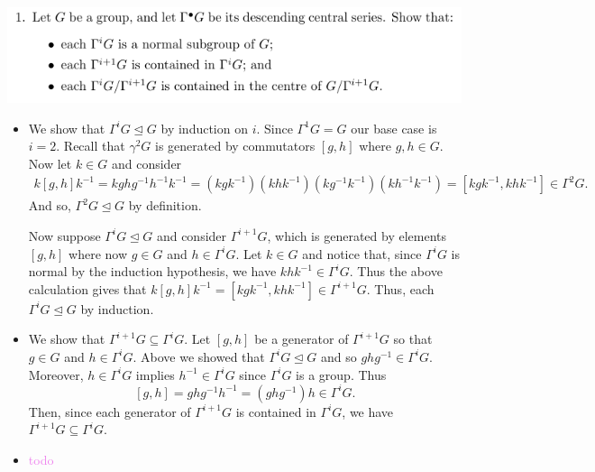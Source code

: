 \documentclass[12pt,letterpaper,boxed]{hmcpset}
\newcommand{\wg}[1]{\textcolor{violet}{#1}}
\newcommand{\inv}{^{-1}}
\newcommand{\normal}{\unlhd} %
\begin{document}


\begin{problem}
	\includegraphics[scale=0.8]{1.png}
	\hfill
\end{problem}

\begin{solution}
\begin{itemize}
\item 
We show that $\Gamma^iG \normal G$ by induction on $i$. Since
$\Gamma^1 G = G$ our base case is $i=2$. Recall that $\gamma^2 G$ is
generated by commutators $[g,h]$ where $g, h \in G$. Now let $k \in G$
and consider 
\begin{align*}
	k [g,h] k\inv = k g h g\inv h\inv k\inv
	= (kgk\inv)(k h k\inv) (k g\inv k\inv) (k h\inv k\inv)
	= [k g k\inv, k h k\inv] \in \Gamma^2 G.
\end{align*}
And so, $\Gamma^2 G \normal G$ by definition.

Now suppose $\Gamma^i G \normal G$ and consider $\Gamma^{i+1} G$,
which is generated by elements $[g,h]$ where now $g \in G$ and $h \in
\Gamma^i G$. Let $k \in G$ and notice that, since $\Gamma^i G$ is
normal by the induction hypothesis, 
we have $k h k\inv \in \Gamma^iG$. Thus the above calculation
gives that $k[g,h]k \inv = [k g k\inv, k h k\inv] \in \Gamma^{i+1}G$.
Thus, each $\Gamma^i G \normal G$ by induction.

\item 
We show that $\Gamma^{i+1} G \subseteq \Gamma^i G$. Let $[g,h]$ be a
generator of $\Gamma^{i+1}G$ so that $g \in G$ and $h \in
\Gamma^{i}G$. 
Above we showed that $\Gamma^i G \normal G$ and so $ghg\inv \in
\Gamma^i G$. Moreover, $h \in \Gamma^i G$ implies $h\inv \in \Gamma^i
G$ since $\Gamma^i G$ is a group. Thus \[
	[g,h] = ghg\inv h\inv = (g h g\inv) h \in \Gamma^i G. 
\]
Then, since each generator of $\Gamma^{i+1} G$ is contained in
$\Gamma^i G$, we have $\Gamma^{i+1} G \subseteq \Gamma^{i}G$. 

\item \wg{todo}
\end{itemize}

\end{solution}
\end{document}
